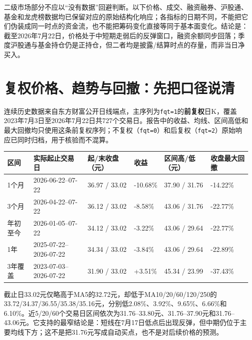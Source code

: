 二级市场部分不应以“没有数据”回避判断。以下价格、成交、融资融券、沪股通、基金和龙虎榜数据均已保留对应的原始结构化响应；各指标的日期不同，不能把它们伪装成同一时点的资金流，也不能把筹码变化直接等同于基本面变化。结论是：截至2026年7月22日，价格处于中短期走弱后的反弹窗口，融资余额同步回落；季度沪股通与基金持仓仍是正持仓，但二者均是披露/结算时点的存量，而非当日净买入。

\section{复权价格、趋势与回撤：先把口径说清}

连续历史数据来自东方财富公开日线端点，主序列为\texttt{fqt=1}的\textbf{前复权}日K，覆盖2023年7月3日至2026年7月22日共727个交易日。报告中的收益、均线、区间高低和最大回撤均只使用这条前复权序列；不复权（\texttt{fqt=0}）和后复权（\texttt{fqt=2}）原始响应已同时归档，用于核验而不混算。

\begin{exhibitbox}
\small
\begin{tabularx}{\exhibitboxwidth}{L{2.1cm}L{3.0cm}R{2.2cm}R{1.6cm}L{3.2cm}X}
\toprule
\textbf{区间} & \textbf{实际起止交易日} & \textbf{起/末收盘（元）} & \textbf{收益} & \textbf{区间高/低（元）} & \textbf{收盘最大回撤} \\
\midrule
1个月 & 2026-06-22--07-22 & 36.97 / 33.02 & -10.68\% & 37.90 / 31.76 & -14.22\% \\
3个月 & 2026-04-22--07-22 & 36.12 / 33.02 & -8.58\% & 43.06 / 31.76 & -22.77\% \\
年初至今 & 2026-01-05--07-22 & 34.12 / 33.02 & -3.22\% & 43.06 / 29.64 & -22.77\% \\
1年 & 2025-07-22--2026-07-22 & 34.34 / 33.02 & -3.84\% & 43.06 / 29.64 & -22.89\% \\
3年覆盖 & 2023-07-03--2026-07-22 & 31.90 / 33.02 & +3.51\% & 45.34 / 23.99 & -37.43\% \\
\bottomrule
\end{tabularx}
\end{exhibitbox}

截止日33.02元仅略高于MA5的32.72元，却低于MA10/20/60/120/250的33.72/34.37/36.55/35.38/35.16元，分别低2.08\%、3.92\%、9.65\%、6.66\%和6.10\%。近5/20/60个交易日区间依次为31.76--33.80元、31.76--37.90元和31.76--43.06元。它支持的最窄结论是：短线在7月17日低点后出现反弹，但中期仍位于主要均线下方；这不是把31.76元写成自动买点，也不是对后续价格的预测。

